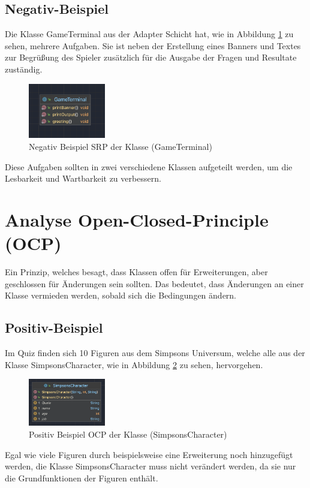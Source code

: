 \subsection{Negativ-Beispiel}
Die Klasse GameTerminal aus der Adapter Schicht hat, wie in Abbildung \ref{fig:UMLGameTerminal} zu sehen, mehrere Aufgaben. Sie ist neben der Erstellung eines Banners und Textes zur Begrüßung des Spieler zusätzlich für die Ausgabe der Fragen und Resultate zuständig.
\begin{figure}[ht]
    \centering
    \includegraphics[width=0.3\textwidth]{Bilder/GT.png}
    \caption{Negativ Beispiel SRP der Klasse (GameTerminal)}
    \label{fig:UMLGameTerminal}
\end{figure}
Diese Aufgaben sollten in zwei verschiedene Klassen aufgeteilt werden, um die Lesbarkeit und Wartbarkeit zu verbessern.
\newpage
\section{Analyse Open-Closed-Principle (OCP)}
Ein Prinzip, welches besagt, dass Klassen offen für Erweiterungen, aber geschlossen für Änderungen sein sollten. Das bedeutet, dass Änderungen an einer Klasse vermieden werden, sobald sich die Bedingungen ändern. \cite{martin.2017}
\subsection{Positiv-Beispiel}
Im Quiz finden sich 10 Figuren aus dem Simpsons Universum, welche alle aus der Klasse SimpsonsCharacter, wie in Abbildung \ref{fig:UMLSimpsonsCharacter} zu sehen, hervorgehen.

\begin{figure}[ht]
    \centering
    \includegraphics[width=0.3\textwidth]{Bilder/SC.png}
    \caption{Positiv Beispiel OCP der Klasse (SimpsonsCharacter)}
    \label{fig:UMLSimpsonsCharacter}
\end{figure}
Egal wie viele Figuren durch beispielsweise eine Erweiterung noch hinzugefügt werden, die Klasse SimpsonsCharacter muss nicht verändert werden, da sie nur die Grundfunktionen der Figuren enthält.
